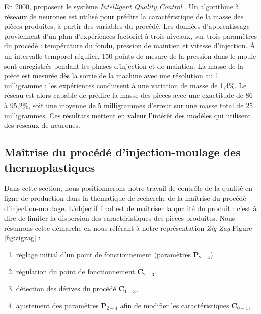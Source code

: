 
En 2000, \citeauthor{schnerr-haselbarth_automation_2000} proposent le système \textit{Intelligent Quality Control} \cite{schnerr-haselbarth_automation_2000}.
Un algorithme à réseaux de neurones est utilisé pour prédire la caractéristique de la masse des pièces produites, à partir des variables du procédé.
Les données d’apprentissage proviennent d’un plan d'expériences factoriel à trois niveaux, sur trois paramètres du procédé : température du fondu, pression de maintien et vitesse d’injection.
À un intervalle temporel régulier, 150 points de mesure de la pression dans le moule sont enregistrés pendant les phases d’injection et de maintien.
La masse de la pièce est mesurée dès la sortie de la machine avec une résolution au 1 milligramme ; les expériences conduisent à une variation de masse de 1,4\%.
Le réseau est alors capable de prédire la masse des pièces avec une exactitude de 86 à 95,2\%, soit une moyenne de 5 milligrammes d’erreur sur une masse total de 25 milligrammes.
Ces résultats mettent en valeur l'intérêt des modèles qui utilisent des réseaux de neurones.

\subsection{Maîtrise du procédé d'injection-moulage des thermoplastiques} \label{subsec:process_control}
Dans cette section, nous positionnerons notre travail de contrôle de la qualité en ligne de production dans la thématique de recherche de la maîtrise du procédé d'injection-moulage.
L'objectif final est de maîtriser la qualité du produit : c'est à dire de limiter la dispersion des caractéristiques des pièces produites.
Nous résumons cette démarche en nous référant à notre représentation \textit{Zig-Zag} Figure \ref{fig:zigzag} :
\begin{enumerate}
	\item réglage initial d'un point de fonctionnement (paramètres $\boldsymbol{P}_{2-4}$)  %
	\item régulation du point de fonctionnement $\boldsymbol{C}_{2-3}$  %
	\item détection des dérives du procédé $\boldsymbol{C}_{1-3}$,
	\item ajustement des paramètres $\boldsymbol{P}_{2-4}$ afin de modifier les caractéristiques $\boldsymbol{C}_{0-1}$,
\end{enumerate}

